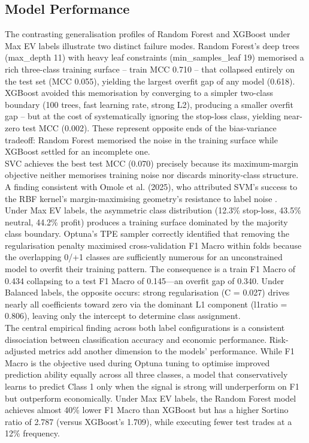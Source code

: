 \subsection{Model Performance}
The contrasting generalisation profiles of Random Forest and XGBoost under Max EV labels illustrate two distinct failure modes. Random Forest's deep trees (max\_depth 11) with heavy leaf constraints (min\_samples\_leaf 19) memorised a rich three-class training surface -- train MCC 0.710 -- that collapsed entirely on the test set (MCC 0.055), yielding the largest overfit gap of any model (0.618). XGBoost avoided this memorisation by converging to a simpler two-class boundary (100 trees, fast learning rate, strong L2), producing a smaller overfit gap -- but at the cost of systematically ignoring the stop-loss class, yielding near-zero test MCC (0.002). These represent opposite ends of the bias-variance tradeoff: Random Forest memorised the noise in the training surface while XGBoost settled for an incomplete one.\\
SVC achieves the best test MCC (0.070) precisely because its maximum-margin objective neither memorises training noise nor discards minority-class structure. A finding consistent with Omole et al. (2025), who attributed SVM’s success to the RBF kernel's margin-maximising geometry’s resistance to label noise \cite{omoleUsingMachineDeep2025}.\\Under Max EV labels, the asymmetric class distribution (12.3\% stop-loss, 43.5\% neutral, 44.2\% profit) produces a training surface dominated by the majority class boundary. Optuna's TPE sampler correctly identified that removing the regularisation penalty maximised cross-validation F1 Macro within folds because the overlapping 0/+1 classes are sufficiently numerous for an unconstrained model to overfit their training pattern. The consequence is a train F1 Macro of 0.434 collapsing to a test F1 Macro of 0.145—an overfit gap of 0.340. Under Balanced labels, the opposite occurs: strong regularisation (C = 0.027) drives nearly all coefficients toward zero via the dominant L1 component (l1ratio = 0.806), leaving only the intercept to determine class assignment.\\
The central empirical finding across both label configurations is a consistent dissociation between classification accuracy and economic performance. Risk-adjusted metrics add another dimension to the models' performance. While F1 Macro is the objective used during Optuna tuning to optimise improved prediction ability equally across all three classes, a model that conservatively learns to predict Class 1 only when the signal is strong will underperform on F1 but outperform economically. Under Max EV labels, the Random Forest model achieves almost 40\% lower F1 Macro than XGBoost but has a higher Sortino ratio of 2.787 (versus XGBoost's 1.709), while executing fewer test trades at a 12\% frequency.\\
